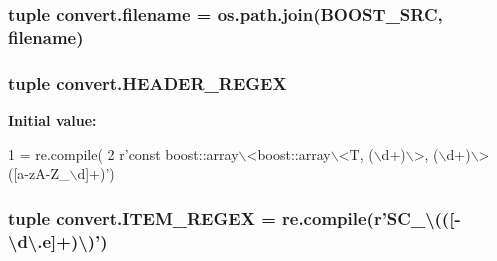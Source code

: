 \subsubsection[{filename}]{\setlength{\rightskip}{0pt plus 5cm}tuple convert.\+filename = os.\+path.\+join({\bf B\+O\+O\+S\+T\+\_\+\+S\+R\+C}, filename)}\label{namespaceconvert_a348778f5084675a813a98d6539c871d1}
\hypertarget{namespaceconvert_a119b9566289fde80d07af96315aa4443}{}
\subsubsection[{H\+E\+A\+D\+E\+R\+\_\+\+R\+E\+G\+E\+X}]{\setlength{\rightskip}{0pt plus 5cm}tuple convert.\+H\+E\+A\+D\+E\+R\+\_\+\+R\+E\+G\+E\+X}\label{namespaceconvert_a119b9566289fde80d07af96315aa4443}
{\bfseries Initial value\+:}
\begin{DoxyCode}
1 = re.compile(
2 \textcolor{stringliteral}{r'const boost::array\(\backslash\)<boost::array\(\backslash\)<T, (\(\backslash\)d+)\(\backslash\)>, (\(\backslash\)d+)\(\backslash\)> ([a-zA-Z\_\(\backslash\)d]+)'})
\end{DoxyCode}
\hypertarget{namespaceconvert_a17f357cf3ab914987d440b880a13d313}{}
\subsubsection[{I\+T\+E\+M\+\_\+\+R\+E\+G\+E\+X}]{\setlength{\rightskip}{0pt plus 5cm}tuple convert.\+I\+T\+E\+M\+\_\+\+R\+E\+G\+E\+X = re.\+compile({\bf r}'S\+C\+\_\+\textbackslash{}((\mbox{[}-\/\textbackslash{}d\textbackslash{}.\+e\mbox{]}+)\textbackslash{})')}\label{namespaceconvert_a17f357cf3ab914987d440b880a13d313}
